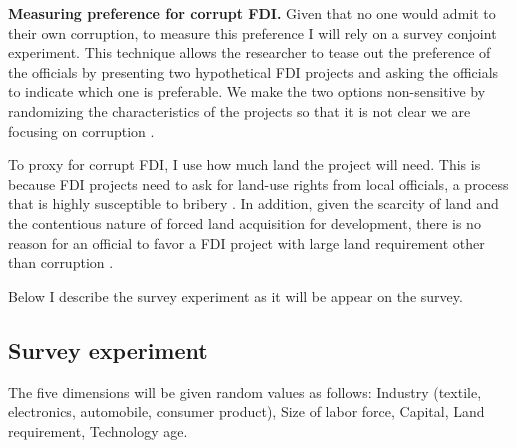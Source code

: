 \documentclass[12pt]{article}
\begin{document}
\textbf{Measuring preference for corrupt FDI.} Given that no one would admit to their own corruption, to measure this preference I will rely on a survey conjoint experiment. This technique allows the researcher to tease out the preference of the officials by presenting two hypothetical FDI projects and asking the officials to indicate which one is preferable. We make the two options non-sensitive by randomizing the characteristics of the projects so that it is not clear we are focusing on corruption \citep{Hainmueller2014}.

To proxy for corrupt FDI, I use how much land the project will need. This is because FDI projects need to ask for land-use rights from local officials, a process that is highly susceptible to bribery \citep{USChamberofCommerce2012}. In addition, given the scarcity of land and the contentious nature of forced land acquisition for development, there is no reason for an official to favor a FDI project with large land requirement other than corruption \citep{AmnestyInternational2012}.

Below I describe the survey experiment as it will be appear on the survey.

\subsection{Survey experiment}


The five dimensions will be given random values as follows: Industry (textile, electronics, automobile, consumer product), 
Size of labor force, Capital, Land requirement, Technology age.
\end{document}
